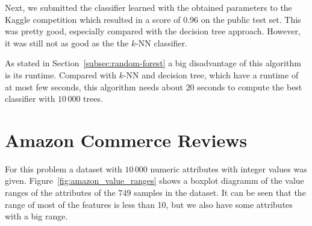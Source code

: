 \documentclass[a4paper,11pt]{article}
\begin{document}
        Next, we submitted the classifier learned with the obtained parameters to the Kaggle competition which resulted in a score of $0.96$ on the public test set. This was pretty good, especially compared with the decision tree approach. However, it was still not as good as the the $k$-NN classifier.
        
        As stated in Section~\ref{subsec:random-forest} a big disadvantage of this algorithm is its runtime. Compared with $k$-NN and decision tree, which have a runtime of at most few seconds, this algorithm needs about $20$ seconds to compute the best classifier with $10\,000$ trees. 
    
\section{Amazon Commerce Reviews}
    For this problem a dataset with $10\,000$ numeric attributes with integer values was given. Figure~\ref{fig:amazon_value_ranges} shows a boxplot diagramm of the value ranges of the attributes of the $749$ samples in the dataset. It can be seen that the range of most of the features is less than 10, but we also have some attributes with a big range. 
    
\end{document}
